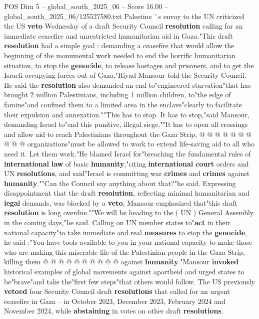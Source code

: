 \begin{textsample}{POS Dim 5 – global\_south\_2025\_06 – Score 16.00 – global\_south\_2025\_06/125527580.txt}  \label{ex:f5_pos_048}
Palestine ' s envoy to the UN criticized the US \textbf{veto} Wednesday of a draft Security Council \textbf{resolution} calling for an immediate ceasefire and unrestricted humanitarian aid in Gaza."This draft \textbf{resolution} had a simple goal : demanding a ceasefire that would allow the beginning of the monumental work needed to end the horrific humanitarian situation, to stop the \textbf{genocide}, to release hostages and prisoners, and to get the Israeli occupying forces out of Gaza,"Riyad Mansour told the Security Council.
He said the \textbf{resolution} also demanded an end to"engineered starvation"that has brought 2 million Palestinians, including 1 million children, to"the edge of famine"and confined them to a limited area in the enclave"clearly to facilitate their expulsion and annexation.""This has to stop.
It has to stop,"said Mansour, demanding Israel to"end this punitive, illegal siege.""It has to open all crossings and allow aid to reach Palestinians throughout the Gaza Strip, @ @ @ @ @ @ @ @ @ @ organizations"must be allowed to work to extend life-saving aid to all who need it.
Let them work."He blamed Israel for"breaching the fundamental rules of \textbf{international} \textbf{law} of basic \textbf{humanity},"citing \textbf{international} \textbf{court} orders and UN \textbf{resolutions}, and said"Israel is committing war \textbf{crimes} and \textbf{crimes} against \textbf{humanity}.""Can the Council say anything about that?"he said.
Expressing disappointment that the draft \textbf{resolution}, reflecting minimal humanitarian and \textbf{legal} demands, was blocked by a \textbf{veto}, Mansour emphasized that"this draft \textbf{resolution} is long overdue.""We will be heading to the ( UN ) General Assembly in the coming days,"he said.
Calling on UN member states to"\textbf{act} in their national capacity"to take immediate and real \textbf{measures} to stop the \textbf{genocide}, he said :"You have tools available to you in your national capacity to make those who are making this miserable life of the Palestinian people in the Gaza Strip, killing them @ @ @ @ @ @ @ @ @ @ against \textbf{humanity}."Mansour \textbf{invoked} historical examples of global movements against apartheid and urged states to be"brave"and take the"first few steps"that others would follow.
The US previously \textbf{vetoed} four Security Council draft \textbf{resolutions} that called for an urgent ceasefire in Gaza -- in October 2023, December 2023, February 2024 and November 2024, while \textbf{abstaining} in votes on other draft \textbf{resolutions}.

\end{textsample}
